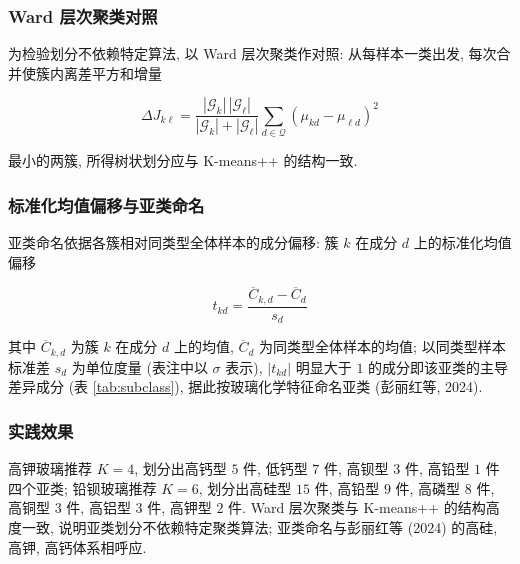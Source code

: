 \documentclass{ctexart}
\begin{document}
\subsubsection{Ward 层次聚类对照}

为检验划分不依赖特定算法, 以 Ward 层次聚类作对照: 从每样本一类出发, 每次合并使簇内离差平方和增量

\begin{equation*}
\Delta{J}_{k\ell}=\frac{\left|\mathcal{G}_k\right|\,\left|\mathcal{G}_\ell\right|}{\left|\mathcal{G}_k\right|+\left|\mathcal{G}_\ell\right|}\sum_{d\in\mathcal{Q}}\left(\mu_{kd}-\mu_{\ell{d}}\right)^{2}
\end{equation*}

最小的两簇, 所得树状划分应与 K-means++ 的结构一致.


\subsubsection{标准化均值偏移与亚类命名}

亚类命名依据各簇相对同类型全体样本的成分偏移: 簇 $k$ 在成分 $d$ 上的标准化均值偏移

\begin{equation*}
t_{kd}=\frac{\overline{C}_{k,d}-\overline{C}_{d}}{s_{d}}
\end{equation*}

其中 $\overline{C}_{k,d}$ 为簇 $k$ 在成分 $d$ 上的均值, $\overline{C}_{d}$ 为同类型全体样本的均值; 以同类型样本标准差 $s_d$ 为单位度量 (表注中以 $\sigma$ 表示), $\left|t_{kd}\right|$ 明显大于 $1$ 的成分即该亚类的主导差异成分 (表 \ref{tab:subclass}), 据此按玻璃化学特征命名亚类 (彭丽红等, 2024).


\subsubsection{实践效果}

高钾玻璃推荐 $K=4$, 划分出高钙型 $5$ 件, 低钙型 $7$ 件, 高钡型 $3$ 件, 高铅型 $1$ 件四个亚类; 铅钡玻璃推荐 $K=6$, 划分出高硅型 $15$ 件, 高铅型 $9$ 件, 高磷型 $8$ 件, 高铜型 $3$ 件, 高铝型 $3$ 件, 高钾型 $2$ 件. Ward 层次聚类与 K-means++ 的结构高度一致, 说明亚类划分不依赖特定聚类算法; 亚类命名与彭丽红等 (2024) 的高硅, 高钾, 高钙体系相呼应.
\end{document}
